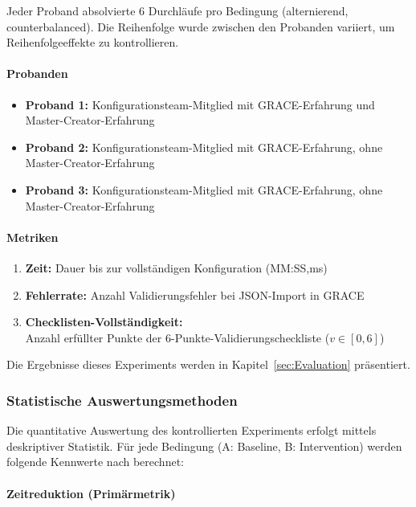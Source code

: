 \noindent Jeder Proband absolvierte 6 Durchläufe pro Bedingung (alternierend, counterbalanced). Die Reihenfolge wurde zwischen den Probanden variiert, um Reihenfolgeeffekte zu kontrollieren.

\paragraph{Probanden}
\begin{itemize}
    \item \textbf{Proband 1:} Konfigurationsteam-Mitglied mit GRACE-Erfahrung und Master-Creator-Erfahrung
    \item \textbf{Proband 2:} Konfigurationsteam-Mitglied mit GRACE-Erfahrung, ohne Master-Creator-Erfahrung
    \item \textbf{Proband 3:} Konfigurationsteam-Mitglied mit GRACE-Erfahrung, ohne Master-Creator-Erfahrung
\end{itemize}

\paragraph{Metriken}
\begin{enumerate}
    \item \textbf{Zeit:} Dauer bis zur vollständigen Konfiguration (MM:SS,ms)
    \item \textbf{Fehlerrate:} Anzahl Validierungsfehler bei JSON-Import in GRACE
    \item \textbf{Checklisten-Vollständigkeit:} \\ Anzahl erfüllter Punkte der 6-Punkte-Validierungscheckliste ($v \in [0, 6]$)
\end{enumerate}

Die Ergebnisse dieses Experiments werden in Kapitel~\ref{sec:Evaluation} präsentiert.

\subsubsection{Statistische Auswertungsmethoden}
\label{subsubsec:StatistischeAuswertung}

Die quantitative Auswertung des kontrollierten Experiments erfolgt mittels deskriptiver Statistik. Für jede Bedingung (A: Baseline, B: Intervention) werden folgende Kennwerte nach \cite{Doering2023} berechnet:

\paragraph{Zeitreduktion (Primärmetrik)}

